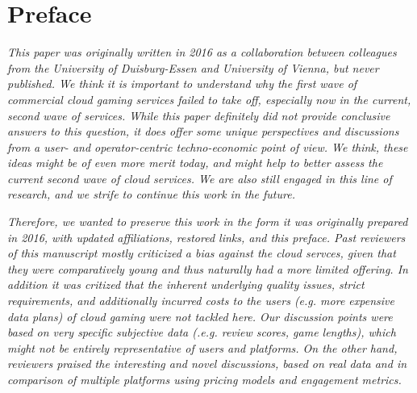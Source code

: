 \section*{Preface}


\textit{This paper was originally written in 2016 as a collaboration between colleagues from the University of Duisburg-Essen and University of Vienna, but never published. 
We think it is important to understand why the first wave of commercial cloud gaming services failed to take off, especially now in the current, second wave of services. 
While this paper definitely did not provide conclusive answers to this question, it does offer some unique perspectives and discussions from a user- and operator-centric techno-economic point of view.
We think, these ideas might be of even more merit today, and might help to better assess the current second wave of cloud services. We are also still engaged in this line of research, and we strife to continue this work in the future.} 

\textit{
Therefore, we wanted to preserve this work in the form it was originally prepared in 2016, with updated affiliations, restored links, and this preface. Past reviewers of this manuscript mostly criticized a bias against the cloud servces, given that they were comparatively young and thus naturally had a more limited offering. In addition it was critized that the inherent underlying quality issues, strict requirements, and additionally incurred costs to the users (e.g. more expensive data plans) of cloud gaming were not tackled here. Our discussion points were based on very specific subjective data (.e.g. review scores, game lengths), which might not be entirely representative of users and platforms.
On the other hand, reviewers praised the interesting and novel discussions, based on real data and in comparison of multiple platforms using pricing models and engagement metrics.}

